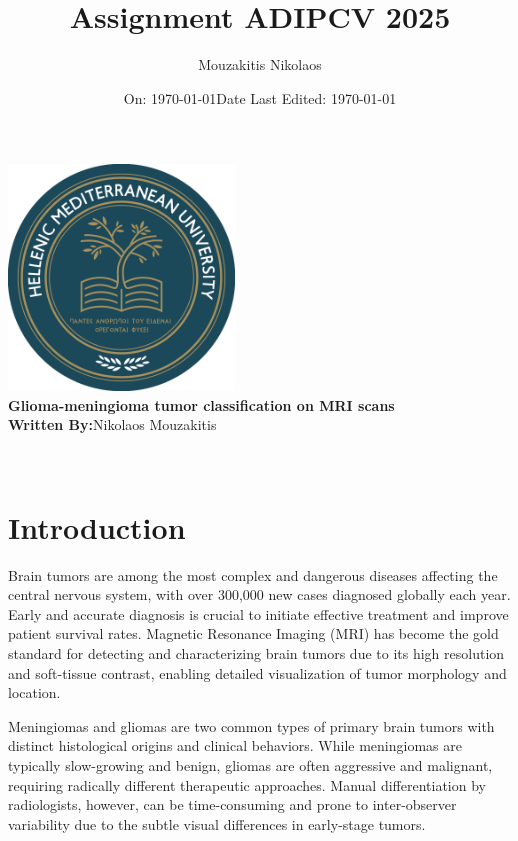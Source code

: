 \documentclass[11pt,a4paper]{article}
\title{\LARGE \textbf{Assignment ADIPCV 2025}}
\author{Mouzakitis Nikolaos}
\date{\large On: \today}
\begin{document}
\makeatletter
\begin{titlepage}
    \centering
    \vspace*{1cm}
       { \includegraphics[width=6cm]{ELMEPA.png}}\\[1cm]

    {\LARGE \textbf{Glioma-meningioma tumor classification on MRI scans }}\\[1cm]
    
    
    \textbf{Written By:}{Nikolaos Mouzakitis}\\[1cm]
    \date{\large Date Last Edited: \today}
    {\@date\\}
\end{titlepage}
\makeatother

\section{Introduction}

Brain tumors are among the most complex and dangerous diseases affecting the central nervous system, with over 300,000 new
cases diagnosed globally each year. Early and accurate diagnosis is crucial to initiate effective treatment and improve patient
survival rates. Magnetic Resonance Imaging (MRI) has become the gold standard for detecting and characterizing brain tumors due
to its high resolution and soft-tissue contrast, enabling detailed visualization of tumor morphology and location.

Meningiomas and gliomas are two common types of primary brain tumors with distinct histological origins and clinical
behaviors. While meningiomas are typically slow-growing and benign, gliomas are often aggressive and malignant,
requiring radically different therapeutic approaches. Manual differentiation by radiologists, however, can be 
time-consuming and prone to inter-observer variability due to the subtle visual differences in early-stage tumors.
\end{document}
